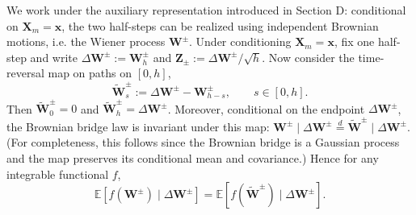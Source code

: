 We work under the auxiliary representation introduced in Section D: conditional on $\bm{X}_m=\bm x$, the two half-steps can be realized using independent Brownian motions, i.e. the Wiener process $\bm{W}^\pm$. Under conditioning $\bm X_m=\bm x$, fix one half-step and write $\Delta\bm W^\pm:=\bm W^\pm_h$ and $\bm Z_\pm:=\Delta\bm W^\pm/\sqrt h$. Now consider the time-reversal map on paths on $[0,h]$,
\[
\widetilde{\bm W}^\pm_s := \Delta\bm W^\pm - \bm W^\pm_{h-s},\qquad s\in[0,h].
\]
Then $\widetilde{\bm W}^\pm_0=0$ and $\widetilde{\bm W}^\pm_h=\Delta\bm W^\pm$.
Moreover, conditional on the endpoint $\Delta\bm W^\pm$, the Brownian bridge law is invariant under this map:
$\bm W^\pm \mid \Delta\bm W^\pm \stackrel{d}{=} \widetilde{\bm W}^\pm\mid \Delta\bm W^\pm$.
(For completeness, this follows since the Brownian bridge is a Gaussian process and the map preserves its conditional mean and covariance.)
Hence for any integrable functional $f$,
\begin{equation}
\mathbb E\!\left[f(\bm W^\pm)\mid \Delta\bm W^\pm\right]=\mathbb E\!\left[f(\widetilde{\bm W}^\pm)\mid \Delta\bm W^\pm\right].
\label{seq:bridge_invariance}
\end{equation}

